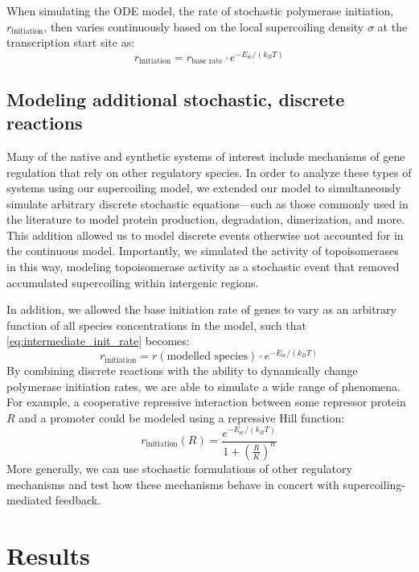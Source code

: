 \documentclass[11pt]{article}
\begin{document}
When simulating the ODE model, the rate of stochastic polymerase initiation, \(r_\text{initiation}\), then varies continuously based on the local supercoiling density \(\sigma\) at the transcription start site as:
\begin{equation}
    r_\text{initiation} = r_\text{base rate} \cdot e^{- E_\text{sc} / (k_B T)}
\label{eq:intermediate_init_rate}
\end{equation}


\subsection{Modeling additional stochastic, discrete reactions}
Many of the native and synthetic systems of interest include mechanisms of gene regulation that rely on other regulatory species. In order to analyze these types of systems using our supercoiling model, we extended our model to simultaneously simulate arbitrary discrete stochastic equations---such as those commonly used in the literature to model protein production, degradation, dimerization, and more. This addition allowed us to model discrete events otherwise not accounted for in the continuous model. Importantly, we simulated the activity of topoisomerases in this way, modeling topoisomerase activity as a stochastic event that removed accumulated supercoiling within intergenic regions. 

In addition, we allowed the base initiation rate of genes to vary as an arbitrary function of all species concentrations in the model, such that \cref{eq:intermediate_init_rate} becomes:
\begin{equation}
    r_\text{initiation} = r(\text{modelled species}) \cdot e^{- E_\text{sc} / (k_B T)}
\label{eq:final_init_rate}
\end{equation}
By combining discrete reactions with the ability to dynamically change polymerase initiation rates, we are able to simulate a wide range of phenomena. 
For example, a cooperative repressive interaction between some repressor protein \(R\) and a promoter could be modeled using a repressive Hill function:
\[
    r_\text{initiation}(R) = \frac{e^{-E_\text{sc} / (k_B T)}}{1 + \left(\frac{R}{K}\right)^n}
\]
More generally, we can use stochastic formulations of other regulatory mechanisms and test how these mechanisms behave in concert with supercoiling-mediated feedback. 

\section{Results}
\end{document}
